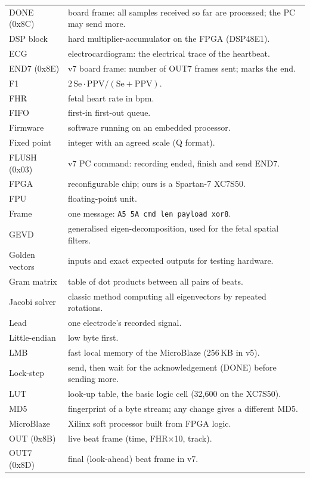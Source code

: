 \documentclass[11pt]{article}
\begin{document}
\begin{center}
\begin{longtable}{@{}p{3.6cm} p{11.4cm}@{}}
DONE (0x8C) & board frame: all samples received so far are processed; the PC may send more. \\
DSP block & hard multiplier-accumulator on the FPGA (DSP48E1). \\
ECG & electrocardiogram: the electrical trace of the heartbeat. \\
END7 (0x8E) & v7 board frame: number of OUT7 frames sent; marks the end. \\
F1 & $2\,\mathrm{Se}\cdot\mathrm{PPV}/(\mathrm{Se}+\mathrm{PPV})$. \\
FHR & fetal heart rate in bpm. \\
FIFO & first-in first-out queue. \\
Firmware & software running on an embedded processor. \\
Fixed point & integer with an agreed scale (Q format). \\
FLUSH (0x03) & v7 PC command: recording ended, finish and send END7. \\
FPGA & reconfigurable chip; ours is a Spartan-7 XC7S50. \\
FPU & floating-point unit. \\
Frame & one message: \texttt{A5 5A cmd len payload xor8}. \\
GEVD & generalised eigen-decomposition, used for the fetal spatial filters. \\
Golden vectors & inputs and exact expected outputs for testing hardware. \\
Gram matrix & table of dot products between all pairs of beats. \\
Jacobi solver & classic method computing all eigenvectors by repeated rotations. \\
Lead & one electrode's recorded signal. \\
Little-endian & low byte first. \\
LMB & fast local memory of the MicroBlaze (256\,KB in v5). \\
Lock-step & send, then wait for the acknowledgement (DONE) before sending more. \\
LUT & look-up table, the basic logic cell (32,600 on the XC7S50). \\
MD5 & fingerprint of a byte stream; any change gives a different MD5. \\
MicroBlaze & Xilinx soft processor built from FPGA logic. \\
OUT (0x8B) & live beat frame (time, FHR$\times$10, track). \\
OUT7 (0x8D) & final (look-ahead) beat frame in v7. \\

\end{longtable}
\end{center}
\end{document}
